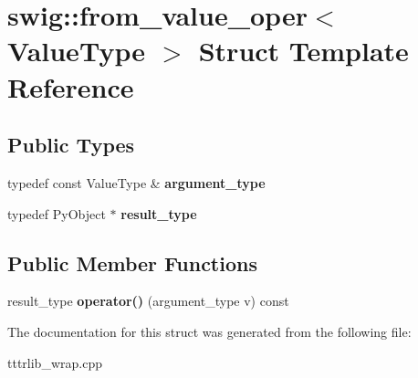 \hypertarget{structswig_1_1from__value__oper}{}\section{swig\+:\+:from\+\_\+value\+\_\+oper$<$ Value\+Type $>$ Struct Template Reference}
\label{structswig_1_1from__value__oper}
\subsection*{Public Types}
\begin{DoxyCompactItemize}
\item 
\mbox{\label{structswig_1_1from__value__oper_a0795f6ec6d52f5782097a674c6d24d18}} 
typedef const Value\+Type \& {\bfseries argument\+\_\+type}
\item 
\mbox{\label{structswig_1_1from__value__oper_a2599f8d784c6f2cdbe22b72611c367a9}} 
typedef Py\+Object $\ast$ {\bfseries result\+\_\+type}
\end{DoxyCompactItemize}
\subsection*{Public Member Functions}
\begin{DoxyCompactItemize}
\item 
\mbox{\label{structswig_1_1from__value__oper_af3d36ed05b22038b478ec15b3d539a40}} 
result\+\_\+type {\bfseries operator()} (argument\+\_\+type v) const
\end{DoxyCompactItemize}


The documentation for this struct was generated from the following file\+:\begin{DoxyCompactItemize}
\item 
tttrlib\+\_\+wrap.\+cpp\end{DoxyCompactItemize}

